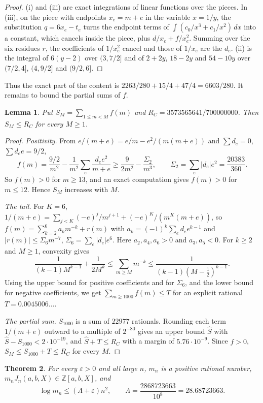 \documentclass[11pt]{amsart}
\newtheorem{theorem}{Theorem}[section]
\newtheorem{lemma}[theorem]{Lemma}
\theoremstyle{definition}
\theoremstyle{remark}
\numberwithin{equation}{section}
\newcommand{\Z}{\mathbb Z}
\begin{document}
\begin{proof}
(i) and (iii) are exact integrations of linear functions over the pieces. In (iii), on the piece with endpoints
$x_e=m+e$ in the variable $x=1/y$, the substitution $q=6x_e-t_e$ turns the endpoint terms of
$\int(c_0/x^3+c_1/x^2)\,dx$ into a constant, which cancels inside the piece, plus $d/x_e+f/x_e^2$. Summing over the six
residues $r$, the coefficients of $1/x_e^2$ cancel and those of $1/x_e$ are the $d_e$. (ii) is the integral of
$6(y-2)$ over $(3,7/2]$ and of $2+2y$, $18-2y$ and $54-10y$ over $(7/2,4]$, $(4,9/2]$ and $(9/2,6]$.
\end{proof}

Thus the exact part of the content is $2263/280+15/4+47/4=6603/280$. It remains to bound the partial sums of $f$.

\begin{lemma}\label{lem:SM}
Put $S_M=\sum_{1\le m<M}f(m)$ and $R_C=3573565641/700000000$. Then $S_M\le R_C$ for every $M\ge1$.
\end{lemma}

\begin{proof}
\emph{Positivity.} From $e/(m+e)=e/m-e^2/(m(m+e))$ and $\sum d_e=0$, $\sum d_ee=9/2$,
\[
 f(m)=\frac{9/2}{m^2}-\frac1{m^2}\sum_e\frac{d_ee^2}{m+e}\ge\frac9{2m^2}-\frac{\Sigma_2}{m^3},\qquad \Sigma_2=\sum_e|d_e|e^2=\frac{20383}{360}.
\]
So $f(m)>0$ for $m\ge13$, and an exact computation gives $f(m)>0$ for $m\le12$. Hence $S_M$ increases with $M$.

\emph{The tail.} For $K=6$, $1/(m+e)=\sum_{j<K}(-e)^j/m^{j+1}+(-e)^K/(m^K(m+e))$, so
$f(m)=\sum_{k=2}^6a_km^{-k}+r(m)$ with $a_k=(-1)^k\sum_ed_ee^{k-1}$ and $|r(m)|\le\Sigma_6m^{-7}$, $\Sigma_6=\sum_e|d_e|e^6$. Here
$a_2,a_4,a_6>0$ and $a_3,a_5<0$. For $k\ge2$ and $M\ge1$, convexity gives
\[
 \frac1{(k-1)M^{k-1}}+\frac1{2M^k}\le\sum_{m\ge M}m^{-k}\le\frac1{(k-1)(M-\frac12)^{k-1}} .
\]
Using the upper bound for positive coefficients and for $\Sigma_6$, and the lower bound for negative coefficients, we get
$\sum_{m\ge1000}f(m)\le T$ for an explicit rational $T=0.0045006\ldots$.

\emph{The partial sum.} $S_{1000}$ is a sum of $22977$ rationals. Rounding each term $1/(m+e)$ outward to a multiple
of $2^{-80}$ gives an upper bound $\hat S$ with $\hat S-S_{1000}<2\cdot10^{-19}$, and $\hat S+T\le R_C$ with a margin of
$5.76\cdot10^{-9}$. Since $f>0$, $S_M\le S_{1000}+T\le R_C$ for every $M$.
\end{proof}

\begin{theorem}\label{thm:content}
For every $\varepsilon>0$ and all large $n$, $m_n$ is a positive rational number, $m_nJ_n(a,b,X)\in\Z[a,b,X]$, and
\[
 \log m_n\le(\Lambda+\varepsilon)n^2,\qquad\Lambda=\frac{2868723663}{10^8}=28.68723663 .
\]
\end{theorem}
\end{document}
